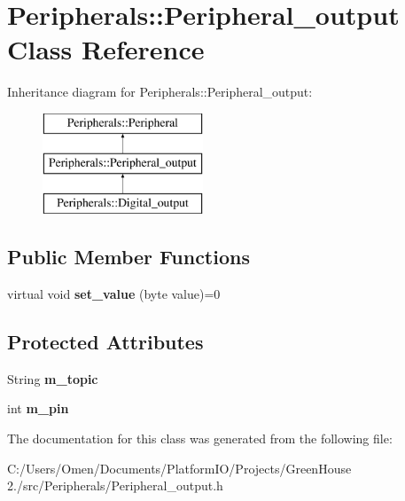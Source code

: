 \hypertarget{class_peripherals_1_1_peripheral__output}{}\section{Peripherals\+:\+:Peripheral\+\_\+output Class Reference}
\label{class_peripherals_1_1_peripheral__output}
Inheritance diagram for Peripherals\+:\+:Peripheral\+\_\+output\+:\begin{figure}[H]
\begin{center}
\leavevmode
\includegraphics[height=3.000000cm]{class_peripherals_1_1_peripheral__output}
\end{center}
\end{figure}
\subsection*{Public Member Functions}
\begin{DoxyCompactItemize}
\item 
\mbox{\label{class_peripherals_1_1_peripheral__output_aab194fda488124e5ad72da21153647c8}} 
virtual void {\bfseries set\+\_\+value} (byte value)=0
\end{DoxyCompactItemize}
\subsection*{Protected Attributes}
\begin{DoxyCompactItemize}
\item 
\mbox{\label{class_peripherals_1_1_peripheral__output_a626bff8cff2b67f3892e28d80b324717}} 
String {\bfseries m\+\_\+topic}
\item 
\mbox{\label{class_peripherals_1_1_peripheral__output_a286da8e267e45985a2b9bff1f6ca6e82}} 
int {\bfseries m\+\_\+pin}
\end{DoxyCompactItemize}


The documentation for this class was generated from the following file\+:\begin{DoxyCompactItemize}
\item 
C\+:/\+Users/\+Omen/\+Documents/\+Platform\+I\+O/\+Projects/\+Green\+House 2./src/\+Peripherals/Peripheral\+\_\+output.\+h\end{DoxyCompactItemize}
